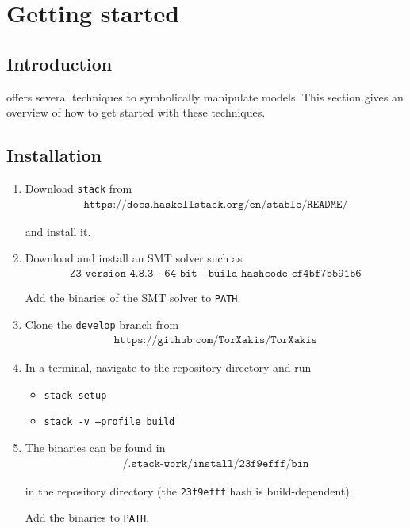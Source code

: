 \chapter{Getting started}

\section{Introduction}

\txs{} offers several techniques to symbolically manipulate \txs{} models.
This section gives an overview of how to get started with these techniques.

\section{Installation}

\begin{enumerate}
\item Download \texttt{stack} from
\begin{align*}
\texttt{https://docs.haskellstack.org/en/stable/README/}
\end{align*}

and install it.

\item Download and install an SMT solver such as
\begin{align*}
\texttt{Z3 version 4.8.3 - 64 bit - build hashcode cf4bf7b591b6}
\end{align*}

Add the binaries of the SMT solver to \texttt{PATH}.
\item Clone the \texttt{develop} branch from
\begin{align*}
\texttt{https://github.com/TorXakis/TorXakis}
\end{align*}
\item In a terminal, navigate to the repository directory and run
\begin{itemize}
\item \texttt{stack setup}
\item \texttt{stack -v --profile build}
\end{itemize}
\item The \txs{} binaries can be found in
\begin{align*}
\texttt{/.stack-work/install/23f9efff/bin}
\end{align*}

in the repository directory (the \texttt{23f9efff} hash is build-dependent).

Add the binaries to \texttt{PATH}.
\end{enumerate}

